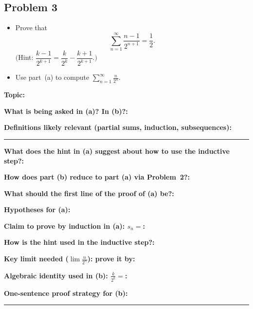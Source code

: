 \documentclass[12pt]{article}
\newcommand{\fillfield}[1]{%
  \par\noindent\textbf{#1:}\enspace\hrulefill\par\vspace{3pt}%
}
\newcommand{\fillfieldlong}[1]{%
  \par\noindent\textbf{#1:}\par\vspace{1.5cm}%
  \noindent\rule{\linewidth}{0.35pt}\par\vspace{4pt}%
}
\begin{document}
\newpage
\subsection{Problem 3}

\begin{tcolorbox}[
  enhanced, breakable,
  colback  = probblue,
  colframe = blue!55!black,
  fonttitle = \bfseries,
  title = {\textsc{Problem Statement}\hfill Homework 6, Problem 3}
]
\begin{itemize}[nosep, leftmargin=1.8em]
  \item[(a)] Prove that
    \[
      \sum_{n=1}^{\infty} \frac{n-1}{2^{n+1}} = \frac{1}{2}.
    \]
    \(\bigl(\)Hint: $\dfrac{k-1}{2^{k+1}} = \dfrac{k}{2^{k}} - \dfrac{k+1}{2^{k+1}}$.$\bigr)$
  \item[(b)] Use part~(a) to compute $\displaystyle\sum_{n=1}^{\infty} \frac{n}{2^n}$.
\end{itemize}
\end{tcolorbox}

\bigskip

\begin{tcolorbox}[
  enhanced, breakable,
  colback  = pass1green,
  colframe = green!55!black,
  fonttitle = \bfseries,
  title = {Pass 1 \enspace\textbf{--}\enspace First Diagnosis}
]
\fillfield{Topic}
\fillfield{What is being asked in (a)? In (b)?}
\fillfieldlong{Definitions likely relevant (partial sums, induction, subsequences)}
\fillfield{What does the hint in (a) suggest about how to use the inductive step?}
\fillfield{How does part (b) reduce to part (a) via Problem~2?}
\fillfield{What should the first line of the proof of (a) be?}
\end{tcolorbox}

\bigskip

\begin{tcolorbox}[
  enhanced, breakable,
  colback  = pass2yellow,
  colframe = yellow!65!black,
  fonttitle = \bfseries,
  title = {Pass 2 \enspace\textbf{--}\enspace Proof Recipe Card}
]
\fillfield{Hypotheses for (a)}
\fillfield{Claim to prove by induction in (a): $s_n =$}
\fillfield{How is the hint used in the inductive step?}
\fillfield{Key limit needed ($\lim \frac{n}{2^n}$): prove it by}
\fillfield{Algebraic identity used in (b): $\frac{k}{2^k} =$}
\fillfieldlong{One-sentence proof strategy for (b)}
\end{tcolorbox}
\end{document}
